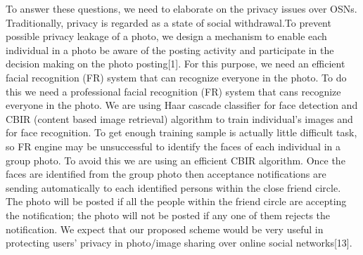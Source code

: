  \vspace*{1pc}
To answer these questions, we need to elaborate on the privacy issues over OSNs. Traditionally, privacy is regarded as a state of social withdrawal.To prevent possible privacy leakage of a photo, we design a mechanism to enable each individual in a photo be aware of the posting activity and participate in the decision making on the photo posting[1]. For this purpose, we need an efficient facial recognition (FR) system that can recognize everyone in the photo. To do this we need a professional facial recognition (FR) system that cans recognize everyone in the photo. We are using Haar cascade classifier for face detection and CBIR (content based image retrieval) algorithm to train individual’s images and for face recognition. To get enough training sample is actually little difficult task, so FR engine may be unsuccessful to identify the faces of each individual in a group photo. To avoid this we are using an efficient CBIR algorithm. Once the faces are identified from the group photo then acceptance notifications are sending automatically to each identified persons within the close friend circle. The photo will be posted if all the people within the friend circle are accepting the notification; the photo will not be posted if any one of them rejects the notification. We expect that our proposed scheme would be very useful in protecting users’ privacy in photo/image sharing over online social networks[13].


